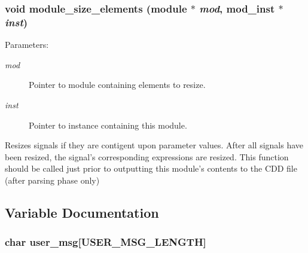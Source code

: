 \subsubsection{\setlength{\rightskip}{0pt plus 5cm}void module\_\-size\_\-elements ({\bf module} $\ast$ {\em mod}, {\bf mod\_\-inst} $\ast$ {\em inst})}\label{module_8c_a3}


\begin{Desc}
\item[Parameters: ]\par
\begin{description}
\item[{\em 
mod}]Pointer to module containing elements to resize. \item[{\em 
inst}]Pointer to instance containing this module.\end{description}
\end{Desc}
Resizes signals if they are contigent upon parameter values. After all signals have been resized, the signal's corresponding expressions are resized. This function should be called just prior to outputting this module's contents to the CDD file (after parsing phase only) 

\subsection{Variable Documentation}
\subsubsection{\setlength{\rightskip}{0pt plus 5cm}char user\_\-msg[USER\_\-MSG\_\-LENGTH]}\label{module_8c_a0}


